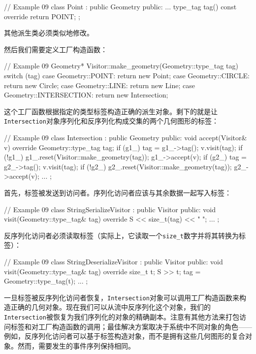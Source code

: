 \begin{code}
{\begin{code}
// Example 09
class Point : public Geometry {
  public:
  ...
  type_tag tag() const override { return POINT; }
};
\end{code}

其他派生类必须类似地修改。

然后我们需要定义工厂构造函数：

\begin{code}
// Example 09
Geometry* Visitor::make_geometry(Geometry::type_tag tag) {
  switch (tag) {
    case Geometry::POINT: return new Point;
    case Geometry::CIRCLE: return new Circle;
    case Geometry::LINE: return new Line;
    case Geometry::INTERSECTION: return new Intersection;
  }
}
\end{code}

这个工厂函数根据指定的类型标签构造正确的派生对象。剩下的就是让\texttt{Intersection}对象序列化和反序列化构成交集的两个几何图形的标签：

\begin{code}
// Example 09
class Intersection : public Geometry {
  public:
  void accept(Visitor& v) override {
    Geometry::type_tag tag;
    if (g1_) tag = g1_->tag();
    v.visit(tag);
    if (!g1_) g1_.reset(Visitor::make_geometry(tag));
    g1_->accept(v);
    if (g2_) tag = g2_->tag();
    v.visit(tag);
    if (!g2_) g2_.reset(Visitor::make_geometry(tag));
    g2_->accept(v);
  }
  ...
};
\end{code}

首先，标签被发送到访问者。序列化访问者应该与其余数据一起写入标签：

\begin{code}
// Example 09
class StringSerializeVisitor : public Visitor {
  public:
  void visit(Geometry::type_tag& tag) override {
    S << size_t(tag) << " ";
  }
  ...
};
\end{code}

反序列化访问者必须读取标签（实际上，它读取一个\texttt{size\_t}数字并将其转换为标签）：

\begin{code}
// Example 09
class StringDeserializeVisitor : public Visitor {
  public:
  void visit(Geometry::type_tag& tag) override {
    size_t t;
    S >> t;
    tag = Geometry::type_tag(t);
  }
  ...
};
\end{code}

一旦标签被反序列化访问者恢复，\texttt{Intersection}对象可以调用工厂构造函数来构造正确的几何对象。现在我们可以从流中反序列化这个对象，我们的\texttt{Intersection}被恢复为我们序列化的对象的精确副本。注意有其他方法来打包访问标签和对工厂构造函数的调用；最佳解决方案取决于系统中不同对象的角色——例如，反序列化访问者可以基于标签构造对象，而不是拥有这些几何图形的复合对象。然而，需要发生的事件序列保持相同。

}
\end{code}
